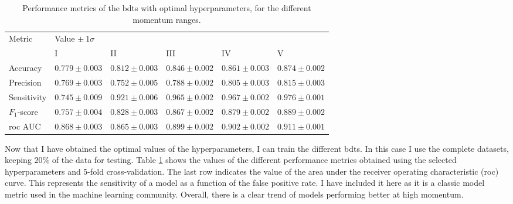 \begin{table}[t]
	\caption{Performance metrics of the \gls{bdt}s with optimal hyperparameters, for the different momentum ranges.}
	\begin{center}
		\begin{small}
			\begin{tabular}{l|lllll}
				\multirow{2}{*}{Metric} & \multicolumn{5}{l}{Value $\pm ~ 1\sigma$}                                                                \\[2mm] \cline{2-6}
										& \rule{0pt}{1.1\normalbaselineskip}I                 & II                & III               & IV                & V                 \\[2mm] \hline
										\rule{0pt}{1.1\normalbaselineskip}Accuracy                & $0.779 \pm 0.003$ & $0.812 \pm 0.003$ & $0.846 \pm 0.002$ & $0.861 \pm 0.003$ & $0.874 \pm 0.002$ \\[2mm]
				Precision               & $0.769 \pm 0.003$ & $0.752 \pm 0.005$ & $0.788 \pm 0.002$ & $0.805 \pm 0.003$ & $0.815 \pm 0.003$ \\[2mm]
				Sensitivity             & $0.745 \pm 0.009$ & $0.921 \pm 0.006$ & $0.965 \pm 0.002$ & $0.967 \pm 0.002$ & $0.976 \pm 0.001$ \\[2mm]
				$F_{1}$-score           & $0.757 \pm 0.004$ & $0.828 \pm 0.003$ & $0.867 \pm 0.002$ & $0.879 \pm 0.002$ & $0.889 \pm 0.002$ \\[2mm]
				\gls{roc} AUC                 & $0.868 \pm 0.003$ & $0.865 \pm 0.003$ & $0.899 \pm 0.002$ & $0.902 \pm 0.002$ & $0.911 \pm 0.001$
			\end{tabular}
		\end{small}
	\end{center}
	\label{tab:bdt_metrics}
\end{table}

Now that I have obtained the optimal values of the hyperparameters, I can train the different \gls{bdt}s. In this case I use the complete datasets, keeping $20\%$ of the data for testing. Table \ref{tab:bdt_metrics} shows the values of the different performance metrics obtained using the selected hyperparameters and 5-fold cross-validation. The last row indicates the value of the area under the receiver operating characteristic (\gls{roc}) curve. This represents the sensitivity of a model as a function of the false positive rate. I have included it here as it is a classic model metric used in the machine learning community. Overall, there is a clear trend of models performing better at high momentum.

